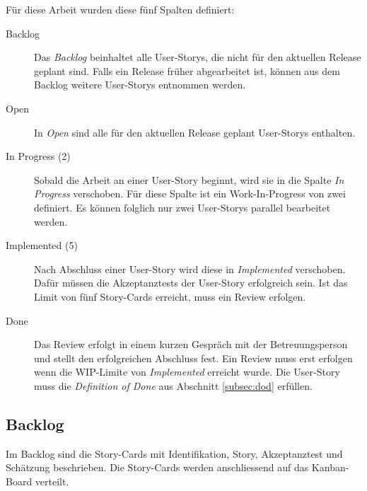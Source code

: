Für diese Arbeit wurden diese fünf Spalten definiert:
\\
\begin{description}
   \item[Backlog]
      Das \emph{Backlog} beinhaltet alle User-Storys, die nicht für den aktuellen Release geplant sind. Falls ein
      Release früher abgearbeitet ist, können aus dem Backlog weitere User-Storys entnommen werden.
   \item[Open]
      In \emph{Open} sind alle für den aktuellen Release geplant User-Storys enthalten.
   \item[In Progress (2)]
      Sobald die Arbeit an einer User-Story beginnt, wird sie in die Spalte \emph{In Progress} verschoben. Für diese Spalte
      ist ein Work-In-Progress von zwei definiert.  Es können folglich nur zwei
      User-Storys parallel bearbeitet werden.
   \item[Implemented (5)]
      Nach Abschluss einer User-Story wird diese in \emph{Implemented} verschoben. Dafür müssen die Akzeptanztests der
      User-Story erfolgreich sein.  Ist das Limit von fünf Story-Cards erreicht, muss ein 
      Review erfolgen.
   \item[Done]
      Das Review erfolgt in einem kurzen Gespräch mit der Betreuungsperson und stellt den erfolgreichen Abschluss fest.
      Ein Review muss erst erfolgen wenn die WIP-Limite von \emph{Implemented} erreicht wurde. Die User-Story muss die
      \emph{Definition of Done} aus Abschnitt \ref{subsec:dod} erfüllen.
\end{description}

\subsection{Backlog}

Im Backlog sind die Story-Cards mit Identifikation, Story, Akzeptanztest und Schätzung beschrieben.
Die Story-Cards werden anschliessend auf das Kanban-Board verteilt. \\

